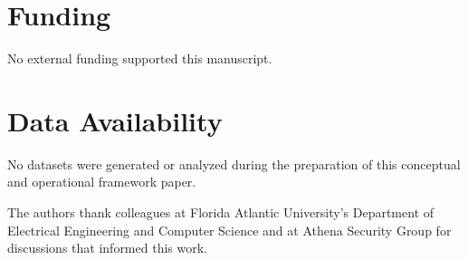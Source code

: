 \documentclass[acmlarge]{acmart}
\begin{document}
\section*{Funding}
No external funding supported this manuscript.

\section*{Data Availability}
No datasets were generated or analyzed during the preparation of this conceptual and operational framework paper.

\begin{acks}
The authors thank colleagues at Florida Atlantic University's Department of Electrical Engineering and Computer Science and at Athena Security Group for discussions that informed this work.
\end{acks}




\end{document}
